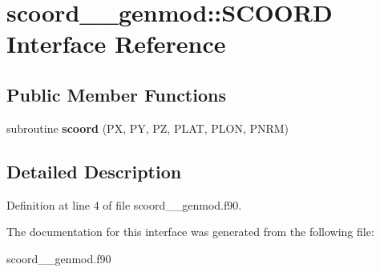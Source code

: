 \hypertarget{interfacescoord____genmod_1_1_s_c_o_o_r_d}{\section{scoord\+\_\+\+\_\+genmod\+:\+:S\+C\+O\+O\+R\+D Interface Reference}
\label{interfacescoord____genmod_1_1_s_c_o_o_r_d}
}
\subsection*{Public Member Functions}
\begin{DoxyCompactItemize}
\item 
\hypertarget{interfacescoord____genmod_1_1_s_c_o_o_r_d_acbb7c8f08752b8a69e31dac928c69f55}{subroutine {\bfseries scoord} (P\+X, P\+Y, P\+Z, P\+L\+A\+T, P\+L\+O\+N, P\+N\+R\+M)}\label{interfacescoord____genmod_1_1_s_c_o_o_r_d_acbb7c8f08752b8a69e31dac928c69f55}

\end{DoxyCompactItemize}


\subsection{Detailed Description}


Definition at line 4 of file scoord\+\_\+\+\_\+genmod.\+f90.



The documentation for this interface was generated from the following file\+:\begin{DoxyCompactItemize}
\item 
scoord\+\_\+\+\_\+genmod.\+f90\end{DoxyCompactItemize}
